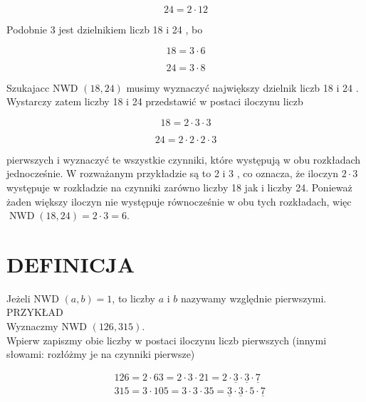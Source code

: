 \documentclass[10pt]{article}
\begin{document}
\[
24=2 \cdot 12
\]

Podobnie 3 jest dzielnikiem liczb 18 i 24 , bo

\[
18=3 \cdot 6
\]

\[
24=3 \cdot 8
\]

Szukajacc NWD \((18,24)\) musimy wyznaczyć największy dzielnik liczb 18 i 24 . Wystarczy zatem liczby 18 i 24 przedstawić w postaci iloczynu liczb

\[
18=2 \cdot 3 \cdot 3
\]

\[
24=2 \cdot 2 \cdot 2 \cdot 3
\]

pierwszych i wyznaczyć te wszystkie czynniki, które występują w obu rozkładach jednocześnie. W rozważanym przykładzie są to 2 i 3 , co oznacza, że iloczyn \(2 \cdot 3\) występuje w rozkładzie na czynniki zarówno liczby 18 jak i liczby 24. Ponieważ żaden większy iloczyn nie występuje równocześnie w obu tych rozkładach, więc \(\operatorname{NWD}(18,24)=2 \cdot 3=6\).

\section*{DEFINICJA}
Jeżeli NWD \((a, b)=1\), to liczby \(a\) i \(b\) nazywamy względnie pierwszymi. PRZYKŁAD\\
Wyznaczmy NWD \((126,315)\).\\
Wpierw zapiszmy obie liczby w postaci iloczynu liczb pierwszych (innymi słowami: rozłóżmy je na czynniki pierwsze)

\[
\begin{aligned}
& 126=2 \cdot 63=2 \cdot 3 \cdot 21=2 \cdot \underline{3} \cdot \underline{3} \cdot \underline{7} \\
& 315=3 \cdot 105=3 \cdot 3 \cdot 35=\underline{3} \cdot \underline{3} \cdot 5 \cdot \underline{7}
\end{aligned}
\]
\end{document}
